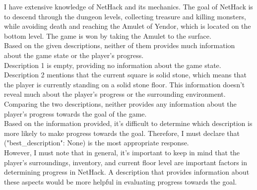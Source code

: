 \documentclass{article} %
\begin{document}
\begin{modeloutput}[h]
\begin{mymessagebox}[frametitle=Empty message \\ vs \\``It's solid stone."]
\small{}\selectfont
I have extensive knowledge of NetHack and its mechanics. The goal of NetHack is to descend through the dungeon levels, collecting treasure and killing monsters, while avoiding death and reaching the Amulet of Yendor, which is located on the bottom level. The game is won by taking the Amulet to the surface. \\

Based on the given descriptions, neither of them provides much information about the game state or the player's progress. \\

Description 1 is empty, providing no information about the game state. \\

Description 2 mentions that the current square is solid stone, which means that the player is currently standing on a solid stone floor. This information doesn't reveal much about the player's progress or the surrounding environment. \\

Comparing the two descriptions, neither provides any information about the player's progress towards the goal of the game. \\

Based on the information provided, it's difficult to determine which description is more likely to make progress towards the goal. Therefore, I must declare that ("best\_description": None) is the most appropriate response. \\

However, I must note that in general, it's important to keep in mind that the player's surroundings, inventory, and current floor level are important factors in determining progress in NetHack. A description that provides information about these aspects would be more helpful in evaluating progress towards the goal.
\end{mymessagebox}
\caption{Answer of Llama 2 70b with default prompt when tasked to evaluate an empty message to the message ``It' solid stone", which is encountered by the agent when bumping into a wall. For two equally not helpful messages, the model is able to refuse to give an answer. }
\label{prm:unkown_answer}
\end{modeloutput}
\end{document}
